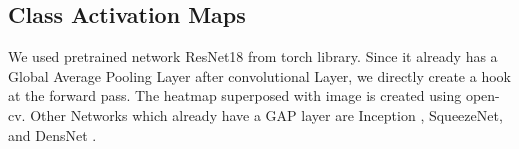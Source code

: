 \subsection{Class Activation Maps}
We used pretrained network ResNet18 \cite{ResNet} from torch library. 
Since it already has a Global Average Pooling Layer after convolutional Layer, we directly create a hook at the forward pass. The heatmap superposed with image is created using open-cv.
Other Networks which already have a GAP layer are Inception \cite{Inception}, SqueezeNet\cite{SqueezeNet}, and DensNet \cite{DensNet}.